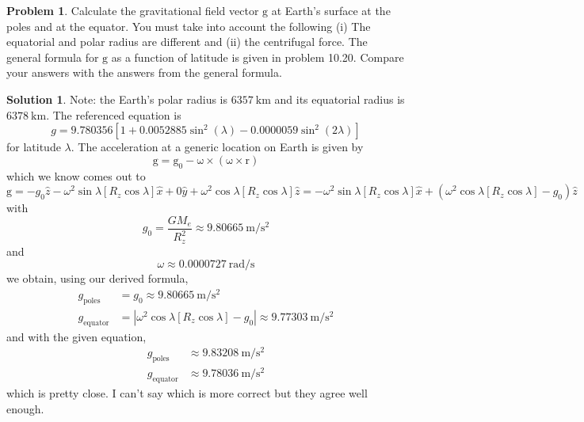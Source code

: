 \documentclass[10pt]{article}
\theoremstyle{definition}
\newtheorem{problem}{Problem}
\newtheorem{soln}{Solution}
\newcommand{\ux}{\hat{x}}
\newcommand{\uy}{\hat{y}}
\newcommand{\uz}{\hat{z}}
\newcommand{\bv}[1]{\bm{\mathrm{#1}}}
\begin{document}
\begin{problem}
Calculate the gravitational field vector $\bv{g}$ at Earth's surface at the poles and at the equator. You
must take into account the following (i) The equatorial and polar radius are different and (ii)
the centrifugal force. The general formula for $\bv{g}$ as a function of latitude is given in problem
10.20. Compare your answers with the answers from the general formula.
\end{problem}
\begin{soln}
  Note: the Earth's polar radius is $\qty{6357}{\kilo\meter}$ and its equatorial radius is $\qty{6378}{\kilo\meter}$. The referenced equation is
  $$g=9.780356\left[1+0.0052885\sin^2\left(\lambda\right)-0.0000059\sin^2\left(2\lambda\right)\right]$$
  for latitude $\lambda$. The acceleration at a generic location on Earth is given by
  $$\bv{g}=\bv{g}_0-\bv{\omega}\times\left(\bv{\omega}\times\bv{r}\right)$$
  which we know comes out to
  $$\bv{g}=-g_0\uz-\omega^2\sin\lambda\left[ R_z\cos\lambda\right]\ux
    +0\uy+\omega^2\cos\lambda\left[ R_z\cos\lambda\right]\uz=
    -\omega^2\sin\lambda\left[ R_z\cos\lambda\right]\ux+\left(\omega^2\cos\lambda\left[ R_z\cos\lambda\right]-g_0\right)\uz
  $$
  with
  $$g_0=\frac{GM_e}{R_z^2}\approx \qty{9.80665}{\meter\per\second\squared}$$
  and
  $$\omega\approx \qty{0.0000727}{\radian\per\second}$$
  we obtain, using our derived formula,
  \begin{align*}
    g_{\text{poles}}   & =g_0\approx\qty{9.80665}{\meter\per\second\squared}                                                               \\
    g_{\text{equator}} & =\left|\omega^2\cos\lambda\left[ R_z\cos\lambda\right]-g_0\right|\approx \qty{9.77303}{\meter\per\second\squared}
  \end{align*}
  and with the given equation,
  \begin{align*}
    g_{\text{poles}}   & \approx\qty{9.83208}{\meter\per\second\squared}  \\
    g_{\text{equator}} & \approx \qty{9.78036}{\meter\per\second\squared}
  \end{align*}
  which is pretty close. I can't say which is more correct but they agree well enough.
\end{soln}
\end{document}
